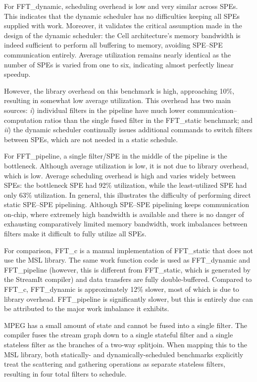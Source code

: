 For \textsf{FFT\_dynamic}, scheduling overhead is low and very similar across SPEs.
This indicates that the dynamic scheduler has no difficulties keeping all SPEs supplied with work.
Moreover, it validates the critical assumption made in the design of the dynamic scheduler:
the Cell architecture's memory bandwidth is indeed sufficient to perform all buffering to memory, avoiding SPE--SPE communication entirely.
Average utilization remains nearly identical as the number of SPEs is varied from one to six,
indicating almost perfectly linear speedup.

However, the library overhead on this benchmark is high, approaching 10\%, resulting in somewhat low average utilization. This overhead has two main sources: \emph{i}) individual filters in the pipeline have much lower communication--computation ratios than the single fused filter in the \textsf{FFT\_static} benchmark; and \emph{ii}) the dynamic scheduler continually issues additional commands to switch filters between SPEs, which are not needed in a static schedule.

For \textsf{FFT\_pipeline}, a single filter/SPE in the middle of the pipeline is the bottleneck.
Although average utilization is low, it is not due to library overhead, which is low.
Average scheduling overhead is high and varies widely between SPEs:
the bottleneck SPE had 92\% utilization, while the least-utilized SPE had only 63\% utilization.
In general, this illustrates the difficulty of performing direct static SPE--SPE pipelining.
Although SPE--SPE pipelining keeps communication on-chip, where extremely high bandwidth
is available and there is no danger of exhausting comparatively limited memory bandwidth,
work imbalances between filters make it difficult to fully utilize all SPEs.

For comparison, \textsf{FFT\_c} is a manual implementation of \textsf{FFT\_static} that
does not use the MSL library. The same work function code is used as \textsf{FFT\_dynamic} and
\textsf{FFT\_pipeline} (however, this is different from \textsf{FFT\_static},
which is generated by the StreamIt compiler) and data transfers are fully double-buffered.
Compared to \textsf{FFT\_c}, \textsf{FFT\_dynamic} is approximately 12\% slower, most of which
is due to library overhead. \textsf{FFT\_pipeline} is significantly slower, but this
is entirely due can be attributed to the major work imbalance it exhibits.

MPEG has a small amount of state and cannot be fused into a single filter.
The compiler fuses the stream graph down to a single stateful filter and
a single stateless filter as the branches of a two-way splitjoin.
When mapping this to the MSL library, both statically- and dynamically-scheduled benchmarks
explicitly treat the scattering and gathering operations as separate stateless filters,
resulting in four total filters to schedule.

